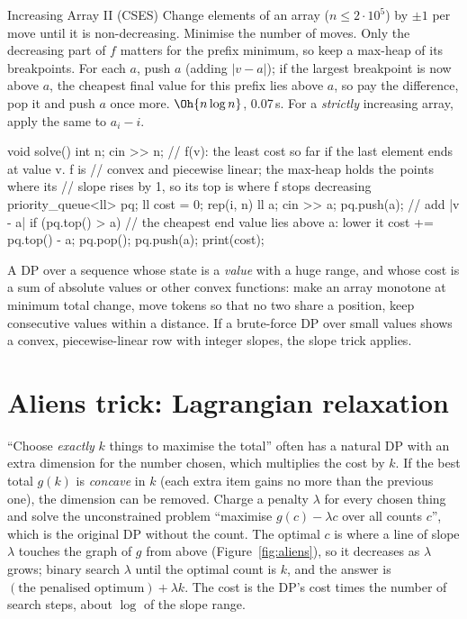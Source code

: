 \begin{problem}{Increasing Array II (CSES)}
Change elements of an array ($n \le 2 \cdot 10^5$) by $\pm 1$ per move until it is non-decreasing. Minimise the number of moves.
\solution Only the decreasing part of $f$ matters for the prefix minimum, so keep a max-heap of its breakpoints. For each $a$, push
$a$ (adding $|v - a|$); if the largest breakpoint is now above $a$, the cheapest final value for this prefix lies above $a$, so pay
the difference, pop it and push $a$ once more. $\Oh{n \log n}$, 0.07\,s. For a \emph{strictly} increasing array, apply the same to
$a_i - i$.
\end{problem}

\begin{code}
void solve() {
    int n;
    cin >> n;
    // f(v): the least cost so far if the last element ends at value v. f is
    // convex and piecewise linear; the max-heap holds the points where its
    // slope rises by 1, so its top is where f stops decreasing
    priority_queue<ll> pq;
    ll cost = 0;
    rep(i, n) {
        ll a;
        cin >> a;
        pq.push(a);  // add |v - a|
        if (pq.top() > a) {  // the cheapest end value lies above a: lower it
            cost += pq.top() - a;
            pq.pop();
            pq.push(a);
        }
    }
    print(cost);
}
\end{code}


\begin{recognize}
A DP over a sequence whose state is a \emph{value} with a huge range, and whose cost is a sum of absolute values or other convex
functions: make an array monotone at minimum total change, move tokens so that no two share a position, keep consecutive values within
a distance. If a brute-force DP over small values shows a convex, piecewise-linear row with integer slopes, the slope trick applies.
\end{recognize}

\section[Aliens trick]{Aliens trick: Lagrangian relaxation \hfill \ioi}\label{sec:aliens}

``Choose \emph{exactly} $k$ things to maximise the total'' often has a natural DP with an extra dimension for the number chosen, which
multiplies the cost by $k$. If the best total $g(k)$ is \emph{concave} in $k$ (each extra item gains no more than the previous one),
the dimension can be removed. Charge a penalty $\lambda$ for every chosen thing and solve the unconstrained problem ``maximise $g(c) -
\lambda c$ over all counts $c$'', which is the original DP without the count. The optimal $c$ is where a line of slope $\lambda$
touches the graph of $g$ from above (Figure~\ref{fig:aliens}), so it decreases as $\lambda$ grows; binary search $\lambda$ until the
optimal count is $k$, and the answer is $(\text{the penalised optimum}) + \lambda k$. The cost is the DP's cost times the number of
search steps, about $\log$ of the slope range.

